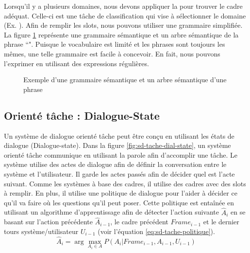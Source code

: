 \documentclass{KodeBook}
\begin{document}
Lorsqu'il y a plusieurs domaines, nous devons appliquer la  pour trouver le cadre adéquat.
Celle-ci est une tâche de classification qui vise à sélectionner le domaine (Ex. ).
Afin de remplir les slots, nous pouvons utiliser une grammaire simplifiée. 
La figure \ref{fig:sd-tache-frame-parse} représente une grammaire sémantique et un arbre sémantique de la phrase ``".
Puisque le vocabulaire est limité et les phrases sont toujours les mêmes, une telle grammaire est facile à concevoir. 
En fait, nous pouvons l'exprimer en utilisant des expressions régulières.

\begin{figure}[!ht]
	\centering
	
	\caption[Exemple d'une grammaire sémantique et un arbre sémantique d'une phrase]{Exemple d'une grammaire sémantique et un arbre sémantique d'une phrase \cite{2020-jurafsky-martin}}
	\label{fig:sd-tache-frame-parse}
\end{figure}

\subsection{Orienté tâche : Dialogue-State}

Un système de dialogue orienté tâche peut être conçu en utilisant les états de dialogue (Dialogue-state). 
Dans la figure \ref{fig:sd-tache-dial-state}, un système orienté tâche communique en utilisant la parole afin d'accomplir une tâche. 
Le système utilise des actes de dialogue afin de définir la conversation entre le système et l'utilisateur. 
Il garde les actes passés afin de décider quel est l'acte suivant.
Comme les systèmes à base des cadres, il utilise des cadres avec des slots à remplir. 
En plus, il utilise une politique de dialogue pour l'aider à décider ce qu'il va faire où les questions qu'il peut poser. 
Cette politique est entaînée en utilisant un algorithme d'apprentissage afin de détecter l'action suivante $ \hat{A}_i $ en se basant sur l'action précédente $\hat{A}_{i-1}$, le cadre précédent $Frame_{i-1}$ et le dernier tours système/utilisateur $ U_{i-1}$ (voir l'équation \ref{eq:sd-tache-politique}).
\begin{equation}\label{eq:sd-tache-politique}
\hat{A}_i = \arg\max_{A_i \in A} P(A_i | Frame_{i-1}, A_{i-1}, U_{i-1})
\end{equation}
\end{document}

